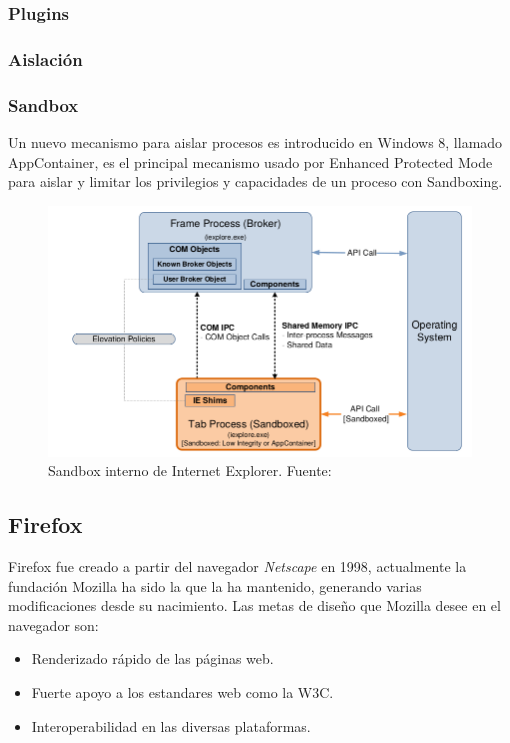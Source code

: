         \subsubsection{Plugins}

        \subsubsection{Aislación}

        \subsubsection{Sandbox}
        Un nuevo mecanismo para aislar procesos es introducido en Windows 8, llamado AppContainer, es el principal mecanismo usado por Enhanced Protected Mode para aislar y limitar los privilegios y capacidades de un proceso con Sandboxing.
        \begin{figure}[h!t]
            \centering
            \includegraphics[scale=0.5]{figures/sandboxIE.png}
            \caption{Sandbox interno de Internet Explorer. Fuente: \cite{Yason}}
            \label{fig:archIE2}
        \end{figure}

    \subsection{Firefox}
    \label{chap3:Firefox}

    Firefox fue creado a partir del navegador \textit{Netscape} en 1998, actualmente la fundación Mozilla ha sido la que la ha mantenido, generando varias modificaciones desde su nacimiento. Las metas de diseño que Mozilla desee en el navegador son:
    \begin{itemize}
        \item Renderizado rápido de las páginas web.
        \item Fuerte apoyo a los estandares web como la W3C.
        \item Interoperabilidad en las diversas plataformas.
    \end{itemize}

